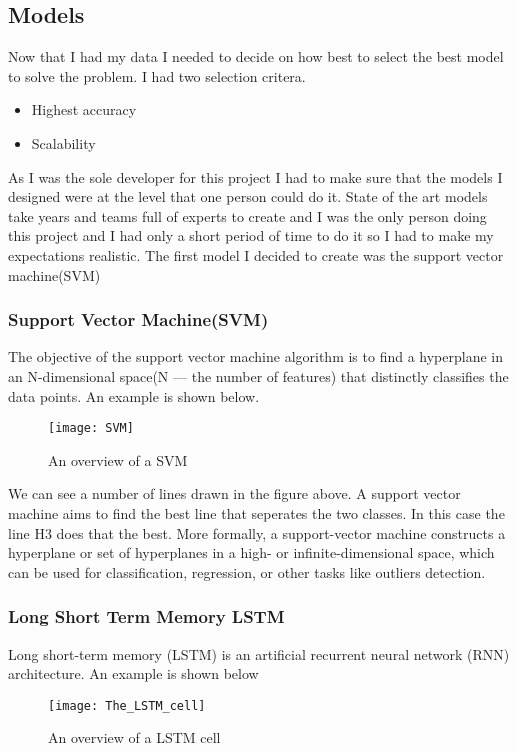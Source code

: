 \subsection{Models}
Now that I had my data I needed to decide on how best to select the best model to solve the problem. I had two selection critera.
\begin{itemize}
	\item Highest accuracy
	\item Scalability
\end{itemize}
As I was the sole developer for this project I had to make sure that the models I designed were at the level that one person could do it. State of the art models take years and teams full of experts to create and I was the only person doing this project and I had only a short period of time to do it so I had to make my expectations realistic. The first model I decided to create was the support vector machine(SVM)
\subsubsection{Support Vector Machine(SVM)}
The objective of the support vector machine algorithm is to find a hyperplane in an N-dimensional space(N — the number of features) that distinctly classifies the data points. An example is shown below.

\begin{figure}[h!]
	\caption{An overview of a SVM}
	\texttt{[image: SVM]}
\end{figure}

We can see a number of lines drawn in the figure above. A support vector machine aims to find the best line that seperates the two classes. In this case the line H3 does that the best. More formally, a support-vector machine constructs a hyperplane or set of hyperplanes in a high- or infinite-dimensional space, which can be used for classification, regression, or other tasks like outliers detection.

\subsubsection{Long Short Term Memory LSTM}
Long short-term memory (LSTM) is an artificial recurrent neural network (RNN) architecture. An example is shown below

\begin{figure}[h!]
	\caption{An overview of a LSTM cell}
	\texttt{[image: The\_LSTM\_cell]}
\end{figure}


